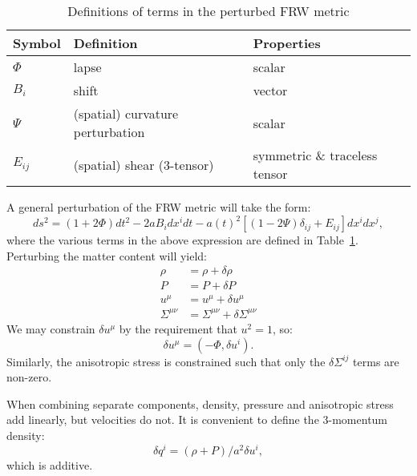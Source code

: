 \begin{table}
  \centering
\begin{tabular}{lll}
 \toprule
  Symbol & Definition & Properties \\
 \midrule
 \midrule
 $\Phi$ & lapse & scalar\\
 $B_i$ & shift & vector\\
 $\Psi$ & (spatial) curvature perturbation  & scalar\\
 $E_{ij}$ & (spatial) shear (3-tensor) & symmetric \& traceless tensor\\
 \bottomrule
\end{tabular}
\caption{Definitions of terms in the perturbed FRW metric}\label{tab:cos:perturbed_metric}
\end{table}


A general perturbation of the FRW metric will take the form:
\begin{equation}
  ds^2 = (1+2\Phi)dt^2 -2a B_i dx^i dt  -a{(t)}^2 \left[ \left( 1 - 2 \Psi \right)\delta_{ij} + E_{ij} \right] dx^i dx^j,
  \label{eqn:cos:FRW_perturb}
\end{equation}
where the various terms in the above expression are defined in Table~\ref{tab:cos:perturbed_metric}. Perturbing the matter content will yield:
\begin{align}
  \rho &= \rho + \delta\rho 
  \label{eqn:cos:rho_perturb}\\
  P &= P + \delta P 
  \label{eqn:cos:P_perturb}\\
  u^\mu &= u^\mu + \delta u^\mu 
  \label{eqn:cos:u_perturb}\\
  \Sigma^{\mu\nu} &= \Sigma^{\mu\nu}+ \delta\Sigma^{\mu\nu}
  \label{eqn:cos:sigma_perturb}
\end{align}
We may constrain $\delta u^\mu$ by the requirement that $u^2=1$, so:
\begin{equation}
  \delta u^\mu = (-\Phi,\delta u^i).
\end{equation}
Similarly, the anisotropic stress is constrained such that only the $\delta\Sigma^{ij}$ terms are non-zero.

When combining separate components, density, pressure and anisotropic stress add linearly, but velocities do not. It is convenient to define the 3-momentum density:
\begin{equation}
  \delta q^i = (\rho+P)/a^2 \delta u^i,
\end{equation}
which is additive.


